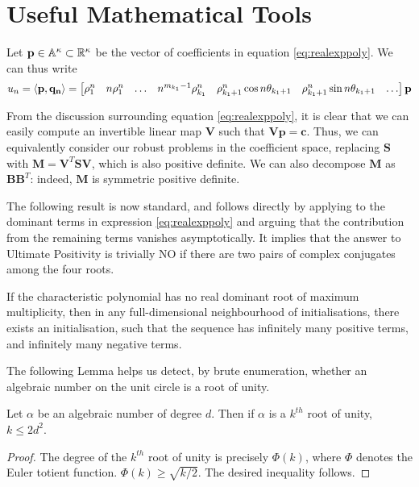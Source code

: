 \section{Useful Mathematical Tools}
\label{section:utils}


Let $\mathbf{p} \in \mathbb{A}^{\kappa} \subset \mathbb{R}^\kappa$ be the vector of coefficients in equation \ref{eq:realexppoly}. We can thus write
\begin{equation}
\label{eq:innerprod}
u_n = \langle\mathbf{p}, \mathbf{q_n}\rangle= 
\begin{bmatrix}
\rho_1^n & n \rho_1^n & \dots & n^{m_{k_1}-1}\rho_{k_1}^n & \rho_{k_1+1}^n\cos n\theta_{k_1+1} & \rho_{k_1+1}^n\sin n\theta_{k_1+1} & \dots
\end{bmatrix}\mathbf{p}
\end{equation}

From the discussion surrounding equation \ref{eq:realexppoly}, it is clear that we can easily compute an invertible linear map $\mathbf{V}$ such that $\mathbf{Vp} = \mathbf{c}$. Thus, we can equivalently consider our robust problems in the coefficient space, replacing $\mathbf{S}$ with $\mathbf{M} = \mathbf{V}^T\mathbf{SV}$, which is also positive definite. We can also decompose $\mathbf{M}$ as $\mathbf{B}\mathbf{B}^T$: indeed, $\mathbf{M}$ is symmetric positive definite. 

The following result is now standard, and follows directly by applying \cite[Lemma 4]{Braverman06} to the dominant terms in expression \ref{eq:realexppoly} and arguing that the contribution from the remaining terms vanishes asymptotically. It implies that the answer to Ultimate Positivity is trivially NO if there are two pairs of complex conjugates among the four roots.

\begin{proposition}
\label{prop:folklore}
If the characteristic polynomial has no real dominant root of maximum multiplicity, then in any full-dimensional neighbourhood of initialisations, there exists an initialisation, such that the sequence has infinitely many positive terms, and infinitely many negative terms.
\end{proposition}

The following Lemma helps us detect, by brute enumeration, whether an algebraic number on the unit circle is a root of unity.
\begin{lemma}
\label{lemma:rootofunity}
Let $\alpha$ be an algebraic number of degree $d$. Then if $\alpha$ is a $k^{th}$ root of unity, $k \le 2d^2$.
\end{lemma}
\begin{proof}
The degree of the $k^{th}$ root of unity is precisely $\Phi(k)$, where $\Phi$ denotes the Euler totient function. $\Phi(k) \ge \sqrt{k/2}$. The desired inequality follows.
\end{proof}